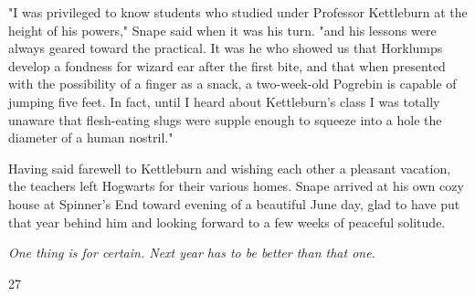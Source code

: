 "I was privileged to know students who studied under Professor Kettleburn at the height of his powers," Snape said when it was his turn. "and his lessons were always geared toward the practical. It was he who showed us that Horklumps develop a fondness for wizard ear after the first bite, and that when presented with the possibility of a finger as a snack, a two-week-old Pogrebin is capable of jumping five feet. In fact, until I heard about Kettleburn's class I was totally unaware that flesh-eating slugs were supple enough to squeeze into a hole the diameter of a human nostril."

Having said farewell to Kettleburn and wishing each other a pleasant vacation, the teachers left Hogwarts for their various homes. Snape arrived at his own cozy house at Spinner's End toward evening of a beautiful June day, glad to have put that year behind him and looking forward to a few weeks of peaceful solitude.

\emph{One thing is for certain. Next year has to be better than that one.}

27 


